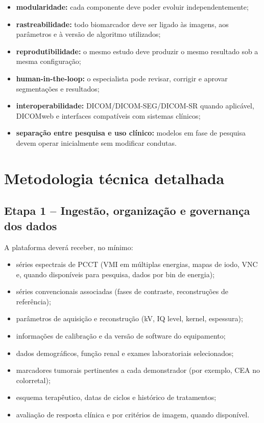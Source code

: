 \documentclass[11pt,a4paper]{article}
\begin{document}
\begin{itemize}
\item \textbf{modularidade:} cada componente deve poder evoluir independentemente;
\item \textbf{rastreabilidade:} todo biomarcador deve ser ligado às imagens, aos parâmetros e à versão de algoritmo utilizados;
\item \textbf{reprodutibilidade:} o mesmo estudo deve produzir o mesmo resultado sob a mesma configuração;
\item \textbf{human-in-the-loop:} o especialista pode revisar, corrigir e aprovar segmentações e resultados;
\item \textbf{interoperabilidade:} DICOM/DICOM-SEG/DICOM-SR quando aplicável, DICOMweb e interfaces compatíveis com sistemas clínicos;
\item \textbf{separação entre pesquisa e uso clínico:} modelos em fase de pesquisa devem operar inicialmente sem modificar condutas.
\end{itemize}

\section{Metodologia técnica detalhada}

\subsection{Etapa 1 -- Ingestão, organização e governança dos dados}

A plataforma deverá receber, no mínimo:

\begin{itemize}
\item séries espectrais de PCCT (VMI em múltiplas energias, mapas de iodo, VNC e, quando disponíveis para pesquisa, dados por bin de energia);
\item séries convencionais associadas (fases de contraste, reconstruções de referência);
\item parâmetros de aquisição e reconstrução (kV, IQ level, kernel, espessura);
\item informações de calibração e da versão de software do equipamento;
\item dados demográficos, função renal e exames laboratoriais selecionados;
\item marcadores tumorais pertinentes a cada demonstrador (por exemplo, CEA no colorretal);
\item esquema terapêutico, datas de ciclos e histórico de tratamentos;
\item avaliação de resposta clínica e por critérios de imagem, quando disponível.
\end{itemize}
\end{document}
